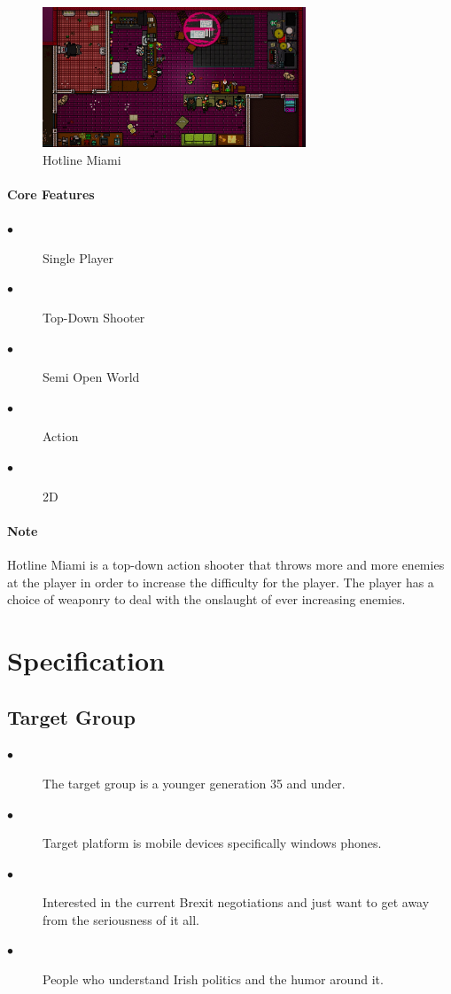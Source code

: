 \documentclass[a4paper]{scrreprt}
\begin{document}
\begin{figure}[H]
\centering
\includegraphics[width=0.70\textwidth]{hotline-miami.jpg}
\caption{\label{fig:art} Hotline Miami}
\end{figure}

\subsubsection{Core Features}
\begin{description}
\item[$\bullet$] Single Player
\item[$\bullet$] Top-Down Shooter
\item[$\bullet$] Semi Open World
\item[$\bullet$] Action
\item[$\bullet$] 2D
\end{description}

\subsubsection{Note}
Hotline Miami is a top-down action shooter that throws more and more enemies at the player in order to increase the difficulty for the player. 
The player has a choice of weaponry to deal with the onslaught of ever increasing enemies.    

\chapter{Specification}

\section{Target Group}

\begin{description}
\item[$\bullet$] The target group is a younger generation 35 and under.
\item[$\bullet$] Target platform is mobile devices specifically windows phones.
\item[$\bullet$] Interested in the current Brexit negotiations and just want to get away from the seriousness of it all.
\item[$\bullet$] People who understand Irish politics and the humor around it.
\end{description}
\end{document}
